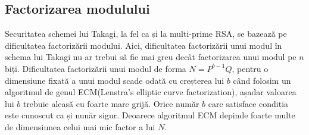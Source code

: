 \documentclass[12pt, oneside]{book}
\begin{document}
\subsection{Factorizarea modulului}
Securitatea schemei lui Takagi, la fel ca și la multi-prime RSA, se bazează pe dificultatea factorizării modului. Aici, dificultatea factorizării unui modul în schema lui Takagi nu ar trebui să fie mai greu decât factorizarea unui modul pe $n$ biți. Dificultatea factorizării unui modul de forma $N=P^{b-1}Q$, pentru o dimensiune fixată a unui modul scade odată cu creșterea lui $b$ când folosim un algoritmul de genul ECM(Lenstra's elliptic curve factorization), așadar valoarea lui $b$ trebuie aleasă cu foarte mare grijă. Orice număr $b$ care satisface condiția este cunoscut ca și nunăr sigur. Deoarece algoritmul ECM depinde foarte multe de dimensiunea celui mai mic factor a lui $N$. 
\end{document}
